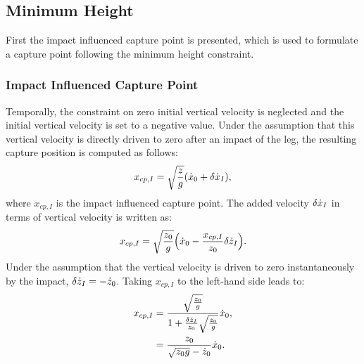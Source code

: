 \subsection{Minimum Height}
First the impact influenced capture point is presented, which is used to formulate a capture point following the minimum height constraint.
\subsubsection{Impact Influenced Capture Point} Temporally, the constraint on zero initial vertical velocity is neglected and the initial vertical velocity is set to a negative value. Under the assumption that this vertical velocity is directly driven to zero after an impact of the leg, the resulting capture position is computed as follows:
\begin{equation}
x_{cp,I} = \sqrt{\frac{z}{g}}(\dot{x}_0+\delta \dot{x}_I),
\end{equation}
where $x_{cp,I}$ is the impact influenced capture point. The added velocity $\delta \dot{x}_I$ in terms of vertical velocity is written as:
\begin{equation}
x_{cp,I} = \sqrt{\frac{z_0}{g}}\Big(\dot{x}_0-\frac{x_{cp,I}}{z_0}\delta \dot{z}_I\Big).
\end{equation}
Under the assumption that the vertical velocity is driven to zero instantaneously by the impact, $\delta \dot{z}_I=-\dot{z}_0$. Taking $x_{cp,I}$ to the left-hand side leads to:
\begin{align}\label{eq:xcpimpact}
x_{cp,I} &= \frac{\sqrt{\frac{z_0}{g}}}{1+\frac{\delta \dot{z}_I}{z_0}\sqrt{\frac{z_0}{g}}}\dot{x}_0,\\
			&= \frac{z_0}{\sqrt{z_0g}-\dot{z}_0}\dot{x}_0.
\end{align}

